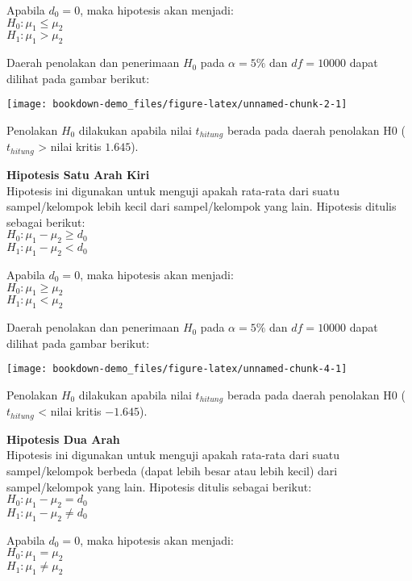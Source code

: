 \documentclass[
]{book}
\begin{document}
Apabila \(d_0 = 0\), maka hipotesis akan menjadi:\\
\(H_0 : \mu_1 \leq \mu_2\)\\
\(H_1 : \mu_1 > \mu_2\)

Daerah penolakan dan penerimaan \(H_0\) pada \(\alpha = 5\%\) dan \(df = 10000\) dapat dilihat pada gambar berikut:

\begin{center}\texttt{[image: bookdown-demo\_files/figure-latex/unnamed-chunk-2-1]} \end{center}

Penolakan \(H_0\) dilakukan apabila nilai \(t_{hitung}\) berada pada daerah penolakan H0 (\(t_{hitung}\) \textgreater{} nilai kritis \(1.645\)).

\textbf{Hipotesis Satu Arah Kiri}\\
Hipotesis ini digunakan untuk menguji apakah rata-rata dari suatu sampel/kelompok lebih kecil dari sampel/kelompok yang lain. Hipotesis ditulis sebagai berikut:\\
\(H_0 : \mu_1-\mu_2 \geq d_0\)\\
\(H_1 : \mu_1-\mu_2 < d_0\)

Apabila \(d_0 = 0\), maka hipotesis akan menjadi:\\
\(H_0 : \mu_1 \geq \mu_2\)\\
\(H_1 : \mu_1 < \mu_2\)

Daerah penolakan dan penerimaan \(H_0\) pada \(\alpha = 5\%\) dan \(df = 10000\) dapat dilihat pada gambar berikut:

\begin{center}\texttt{[image: bookdown-demo\_files/figure-latex/unnamed-chunk-4-1]} \end{center}

Penolakan \(H_0\) dilakukan apabila nilai \(t_{hitung}\) berada pada daerah penolakan H0 (\(t_{hitung}\) \textless{} nilai kritis \(-1.645\)).

\textbf{Hipotesis Dua Arah}\\
Hipotesis ini digunakan untuk menguji apakah rata-rata dari suatu sampel/kelompok berbeda (dapat lebih besar atau lebih kecil) dari sampel/kelompok yang lain. Hipotesis ditulis sebagai berikut:\\
\(H_0 : \mu_1-\mu_2 = d_0\)\\
\(H_1 : \mu_1-\mu_2 \neq d_0\)

Apabila \(d_0 = 0\), maka hipotesis akan menjadi:\\
\(H_0 : \mu_1 = \mu_2\)\\
\(H_1 : \mu_1 \neq \mu_2\)
\end{document}
